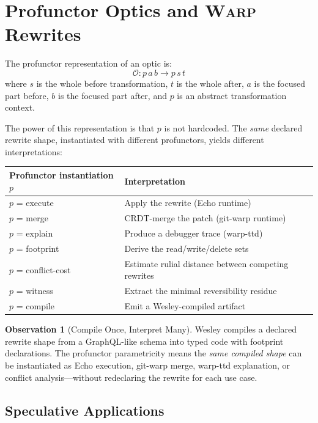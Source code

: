 \documentclass[11pt]{article}
\newcommand{\WARP}{\textsc{Warp}}
\theoremstyle{definition}
\newtheorem{observation}{Observation}
\begin{document}
\section{Profunctor Optics and \WARP{} Rewrites}

The profunctor representation of an optic is:
\[
\mathcal{O} : p\,a\,b \to p\,s\,t
\]
where $s$ is the whole before transformation, $t$ is the whole after,
$a$ is the focused part before, $b$ is the focused part after, and
$p$ is an abstract transformation context.

The power of this representation is that $p$ is not hardcoded. The
\emph{same} declared rewrite shape, instantiated with different
profunctors, yields different interpretations:

\begin{center}
\begin{tabular}{@{}ll@{}}
\toprule
Profunctor instantiation $p$ & Interpretation \\
\midrule
$p$ = execute & Apply the rewrite (Echo runtime) \\
$p$ = merge & CRDT-merge the patch (git-warp runtime) \\
$p$ = explain & Produce a debugger trace (warp-ttd) \\
$p$ = footprint & Derive the read/write/delete sets \\
$p$ = conflict-cost & Estimate rulial distance between competing rewrites \\
$p$ = witness & Extract the minimal reversibility residue \\
$p$ = compile & Emit a Wesley-compiled artifact \\
\bottomrule
\end{tabular}
\end{center}

\begin{observation}[Compile Once, Interpret Many]
\label{obs:compile-once}
Wesley compiles a declared rewrite shape from a GraphQL-like schema
into typed code with footprint declarations. The profunctor
parametricity means the \emph{same compiled shape} can be
instantiated as Echo execution, git-warp merge, warp-ttd explanation,
or conflict analysis---without redeclaring the rewrite for each use
case.
\end{observation}

\subsection{Speculative Applications}
\end{document}
